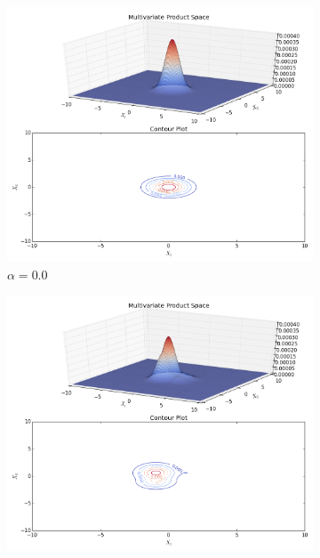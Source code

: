 \documentclass[12pt]{elsarticle}
\begin{document}
\begin{figure}
    \centering
    \begin{subfigure}[b]{0.49\textwidth}
        \centering
       \includegraphics[width = \textwidth, trim = 3cm 11.7cm 1cm 0.5cm, clip]{plots/Annealing-Normalised/Normalised-Mix-Gaussian-anealing-animation0_00.png}
               \caption{$\alpha = 0.0$}
        \label{fig:y equals x}
    \end{subfigure}
    \hfill
    \begin{subfigure}[b]{0.49\textwidth}
        \centering
        \includegraphics[width = \textwidth, trim = 3cm 11.7cm 1cm 0.5cm, clip]{plots/Annealing-Normalised/Normalised-Mix-Gaussian-anealing-animation0_30.png}

\end{subfigure}
\end{figure}
\end{document}
